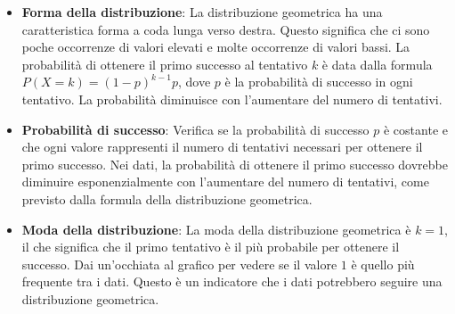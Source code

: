 \begin{itemize}
    \item \textbf{Forma della distribuzione}: La distribuzione geometrica ha una caratteristica forma a coda lunga verso destra. Questo significa che ci sono poche occorrenze di valori elevati e molte occorrenze di valori bassi. La probabilità di ottenere il primo successo al tentativo $k$ è data dalla formula $P(X = k) = (1 - p)^{k-1} p$, dove $p$ è la probabilità di successo in ogni tentativo. La probabilità diminuisce con l'aumentare del numero di tentativi.
    \item \textbf{Probabilità di successo}: Verifica se la probabilità di successo $p$ è costante e che ogni valore rappresenti il numero di tentativi necessari per ottenere il primo successo. Nei dati, la probabilità di ottenere il primo successo dovrebbe diminuire esponenzialmente con l'aumentare del numero di tentativi, come previsto dalla formula della distribuzione geometrica.
    \item \textbf{Moda della distribuzione}: La moda della distribuzione geometrica è $k = 1$, il che significa che il primo tentativo è il più probabile per ottenere il successo. Dai un'occhiata al grafico per vedere se il valore $1$ è quello più frequente tra i dati. Questo è un indicatore che i dati potrebbero seguire una distribuzione geometrica.

\end{itemize}

